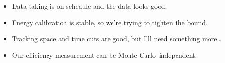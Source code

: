\begin{slide*}

\slideframe{}
\huge
{}

\begin{minipage}[t]{\linewidth}
\LARGE

\begin{itemize}
  \item Data-taking is on schedule and the data looks good.
  \item Energy calibration is stable, so we're trying to tighten the bound.
  \item Tracking space and time cuts are good, but I'll need something more\ldots
  \item Our efficiency measurement can be Monte Carlo--independent.
\end{itemize}

\end{minipage}

\end{slide*}



